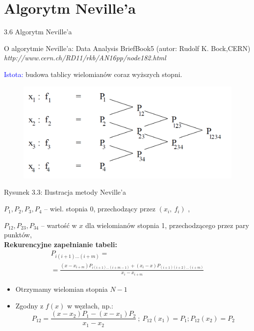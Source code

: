\section{Algorytm Neville'a}
\begin{frame}
{3.6 Algorytm Neville'a}

O algorytmie Neville'a: Data Analysis BriefBook5 (autor: Rudolf K. Bock,CERN)
{\it http://www.cern.ch/RD11/rkb/AN16pp/node182.html} \newline

\textcolor{blue}{Istota:} budowa tablicy wielomianów coraz wyższych stopni.
\begin{figure}[h]
			\includegraphics[scale = 0.28]{img/3/interpol_3_6}
	\end{figure}
Rysunek 3.3: Ilustracja metody Neville'a
\end{frame}

\begin{frame}
$P_{1}, P_{2}, P_{3}, P_{4}$ -- wiel. stopnia $0$, przechodzący przez $(x_{i},\ f_{i})$ ,

$P_{12}, P_{23}, P_{34}$ -- wartość w $x$ dla wielomianów stopnia 1, przechodzącego przez pary punktów, \\
\vspace{4mm}
\textbf{Rekurencyjne zapełnianie tabeli:}
\begin{gather*}
	P_{i(i+1)\ldots(i+m)}=\\
	=\displaystyle \frac{(x-x_{i+m})P_{i(i+1)\ldots(i+m-1)}+(x_{i}-x)P_{(i+1)(i+2)\ldots(i+m)}}{x_{i}-x_{i+m}}
\end{gather*}

\begin{itemize}
\item Otrzymamy wielomian stopnia $N-1$

\item Zgodny z $f(x)$ w węzłach, np.:
$$
P_{12}=\frac{(x-x_{2})P_{1}-(x-x_{1})P_{2}}{x_{1}-x_{2}}\ ;\ P_{12}(x_{1})=P_{1};P_{12}(x_{2})=P_{2}
$$

\end{itemize}

\end{frame}

